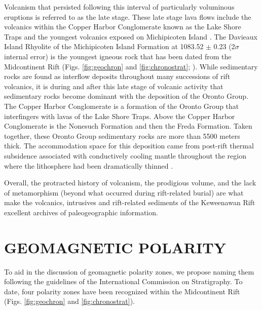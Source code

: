 \documentclass[11pt,letterpaper]{article}
\begin{document}
Volcanism that persisted following this interval of particularly voluminous eruptions is referred to as the late stage. These late stage lava flows include the volcanics within the Copper Harbor Conglomerate known as the Lake Shore Traps \citep{Lane1911a, Davis1990a} and the youngest volcanics exposed on Michipicoten Island \citep{Annells1974a, Fairchild2017a}. The Davieaux Island Rhyolite of the Michipicoten Island Formation at 1083.52 $\pm$ 0.23 (2$\sigma$ internal error) is the youngest igneous rock that has been dated from the Midcontinent Rift (Figs. \ref{fig:geochron} and \ref{fig:chronostrat}; \citealp{Fairchild2017a}). While sedimentary rocks are found as interflow deposits throughout many successions of rift volcanics, it is during and after this late stage of volcanic activity that sedimentary rocks become dominant with the deposition of the Oronto Group. The Copper Harbor Conglomerate is a formation of the Oronto Group that interfingers with lavas of the Lake Shore Traps. Above the Copper Harbor Conglomerate is the Nonesuch Formation and then the Freda Formation. Taken together, these Oronto Group sedimentary rocks are more than 5500 meters thick. The accommodation space for this deposition came from post-rift thermal subsidence associated with conductively cooling mantle throughout the region where the lithosphere had been dramatically thinned \citep{Cannon1992b}.

Overall, the protracted history of volcanism, the prodigious volume, and the lack of metamorphism (beyond what occurred during rift-related burial) are what make the volcanics, intrusives and rift-related sediments of the Keweenawan Rift excellent archives of paleogeographic information.

\section{GEOMAGNETIC POLARITY}

To aid in the discussion of geomagnetic polarity zones, we propose naming them following the guidelines of the International Commission on Stratigraphy. To date, four polarity zones have been recognized within the Midcontinent Rift (Figs. \ref{fig:geochron} and \ref{fig:chronostrat}).
\end{document}
